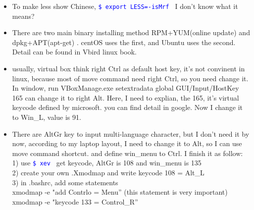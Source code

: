 \documentclass[a4paper,12pt,twoside]{book}
\newcommand{\linuxcommand}[1]{\texttt{\textcolor{blue}{\$ #1 \Pisymbol{psy}{191}}}}
\begin{document}
\begin{itemize}
    \item To make less show Chinese, \linuxcommand{export LESS=-isMrf} I don't know
        what it means?

    \item There are two main binary installing method RPM+YUM(online update) and
        dpkg+APT(apt-get) . centOS uses the first, and Ubuntu uses the second. Detail
        can be found in Vbird linux book.

    \item usually, virtual box think right Ctrl as default host key, it's not convinent in linux,
        because most of move command need right Ctrl, so you need change it.
	In window, run VBoxManage.exe setextradata global GUI/Input/HostKey 165 can change it to right Alt. Here, I need to explian, the 165, it's virtual keycode defined by
	microsoft. you can find detail in google. Now I change it to Win\_L, value is 91.
	
\item There are AltGr key to input multi-language character, but I don't need it by now,
    according to my laptop layout, I need to change it to Alt, so I
	can use move command shortcut. and define win\_menu to Ctrl. I finish it as follow: \\
	1) use \linuxcommand{xev} get keycode, AltGr is 108 and win\_menu is 135 \\
	2) create your own .Xmodmap and write keycode 108 = Alt\_L\\
	3) in .bashrc, add some statements\\
	xmodmap -e "add Contrlo = Menu'' (this statement is very important)\\
	xmodmap -e "keycode 133 = Control\_R''\\
		
	\end{itemize}
\end{document}

